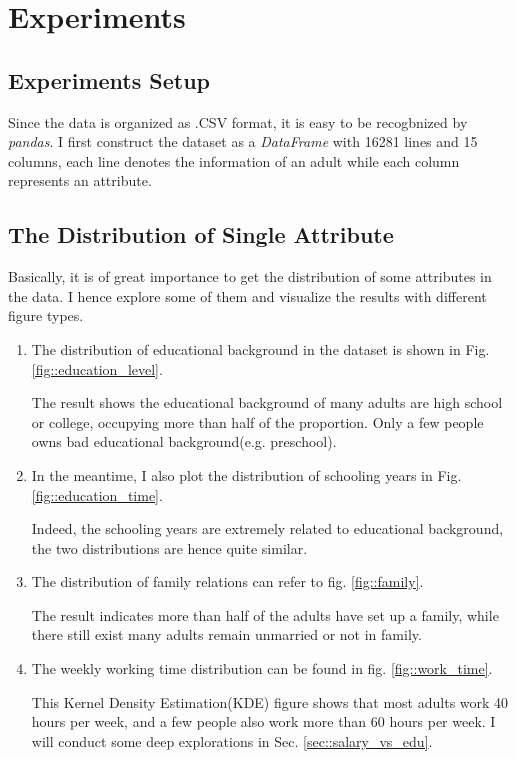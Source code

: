 \documentclass[12pt,a4paper]{article}
\theoremstyle{definition}
\begin{document}
\section{Experiments}

\subsection{Experiments Setup}

Since the data is organized as .CSV format, it is easy to be recogbnized by \textit{pandas}. I first construct the dataset as a \textit{DataFrame} with 16281 lines and 15 columns, each line denotes the information of an adult while each column represents an attribute.

\subsection{The Distribution of Single Attribute}

Basically, it is of great importance to get the distribution of some attributes in the data. I hence explore some of them and visualize the results with different figure types.

\begin{enumerate}
\item The distribution of educational background in the dataset is shown in Fig. \ref{fig::education_level}.

The result shows the educational background of many adults are high school or college, occupying more than half of the proportion. Only a few people owns bad educational background(e.g. preschool).

\item In the meantime, I also plot the distribution of schooling years in Fig. \ref{fig::education_time}.

Indeed, the schooling years are extremely related to educational background, the two distributions are hence quite similar.

\item The distribution of family relations can refer to fig. \ref{fig::family}.

The result indicates more than half of the adults have set up a family, while there still exist many adults remain unmarried or not in family.

\item The weekly working time distribution can be found in fig. \ref{fig::work_time}.

This Kernel Density Estimation(KDE) figure shows that most adults work 40 hours per week, and a few people also work more than 60 hours per week. I will conduct some deep explorations in Sec. \ref{sec::salary_vs_edu}.

\end{enumerate}
\end{document}
